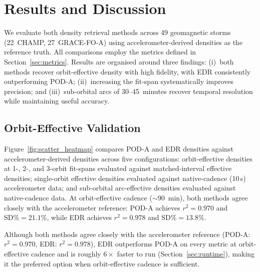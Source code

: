 \documentclass{agujournal2019}
\begin{document}
\section{Results and Discussion}

We evaluate both density retrieval methods across 49 geomagnetic storms
(22~CHAMP, 27~GRACE-FO-A) using accelerometer-derived densities as the
reference truth. All comparisons employ the metrics defined in
Section~\ref{sec:metrics}. Results are organised around three findings:
(i)~both methods recover orbit-effective density with high fidelity, with EDR
consistently outperforming POD-A; (ii)~increasing the fit-span
systematically improves precision; and (iii)~sub-orbital arcs of
30--45~minutes recover temporal resolution while maintaining useful accuracy.

\subsection{Orbit-Effective Validation}
\label{sec:orbit-effective-validation}

Figure~\ref{fig:scatter_heatmap} compares POD-A and EDR densities against
accelerometer-derived densities across five configurations: orbit-effective
densities at 1-, 2-, and 3-orbit fit-spans evaluated against matched-interval
effective densities; single-orbit effective densities evaluated against
native-cadence (10\,s) accelerometer data; and sub-orbital arc-effective
densities evaluated against native-cadence data. At orbit-effective cadence ($\sim$90~min), both
methods agree closely with the accelerometer reference: POD-A achieves
$r^{2} = 0.970$ and $\text{SD\%} = 21.1\%$, while EDR achieves
$r^{2} = 0.978$ and $\text{SD\%} = 13.8\%$.

Although both methods agree closely with the accelerometer reference (POD-A: $r^{2} = 0.970$, EDR: $r^{2} = 0.978$), EDR outperforms POD-A on every metric at orbit-effective cadence and is roughly $6\times$ faster to run (Section~\ref{sec:runtime}), making it the preferred option when orbit-effective cadence is sufficient.
\end{document}
